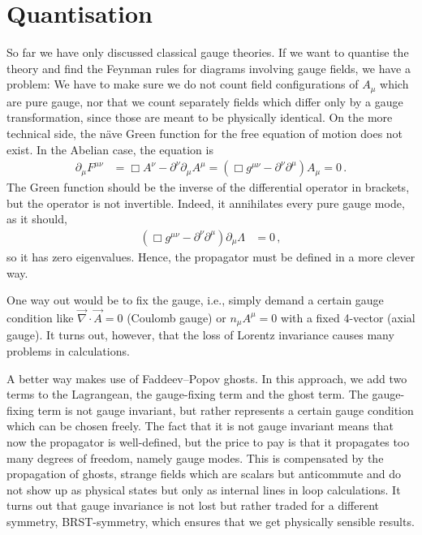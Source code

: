 \documentclass[12pt]{report}
\newcommand{\2}{\ensuremath{\sqrt{2}\,}}
\begin{document}
{    \section{Quantisation}
      So far we have only discussed classical gauge theories. If we want to quantise the theory
      and find the Feynman rules for diagrams involving gauge fields, we have a problem: We have
      to make sure we do not count field configurations of $A_\mu$ which are pure gauge, nor that
      we count separately fields which differ only by a gauge transformation, since those are
      meant to be physically identical. On the more technical side, the na\"{}ve 
      Green function for the free equation of motion does not exist. In the Abelian case, the
      equation is 
      \begin{align}
        \partial_\mu F^{\mu\nu}&=\Box A^\nu -\partial^\nu \partial_\mu A^\mu=\left(\Box g^{\mu\nu}
          -\partial^\nu\partial^\mu\right)A_\mu= 0\,.
      \end{align}
      The Green function should be the inverse of the differential operator in brackets, but the
      operator is not invertible. Indeed, it annihilates every pure gauge mode, as it should,
      \begin{align}
        \left(\Box g^{\mu\nu} -\partial^\nu\partial^\mu\right) \partial_\mu \Lambda &=0\,,
      \end{align}
      so it has zero eigenvalues. Hence, the propagator must be defined in a more clever way.
      
      One way out would be to fix the gauge, i.e., simply demand a certain gauge condition like
      $\vec{\nabla}\cdot \vec{A}=0$ (Coulomb gauge) or $n_\mu
      A^\mu=0$ with a fixed 4-vector (axial gauge). It turns out,
      however, that the loss of Lorentz invariance causes many problems in calculations.
      
      
      A better way makes use of Faddeev--Popov ghosts. In this approach, we add 
      two terms to the Lagrangean, the gauge-fixing term and the ghost term. The gauge-fixing term
      is not gauge invariant, but rather represents a certain gauge condition which can be chosen
      freely. The fact that it is not gauge invariant means that now the propagator is
      well-defined, but the price to pay is that it propagates too many degrees of freedom, namely
      gauge modes. This is compensated by the propagation of ghosts, strange fields which are
      scalars but anticommute and do not show up as physical states but only as internal lines in
      loop calculations.  It turns out that gauge invariance is not lost but rather traded for a
      different symmetry, BRST-symmetry, which ensures that we get physically sensible results.
      
}
\end{document}
